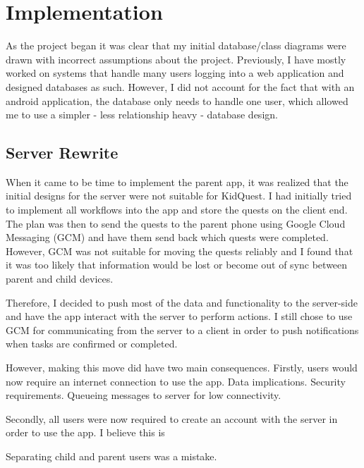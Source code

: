 \chapter{Implementation}

As the project began it was clear that my initial database/class diagrams were drawn with incorrect assumptions about the project. 
Previously, I have mostly worked on systems that handle many users logging into a web application and designed databases as such. 
However, I did not account for the fact that with an android application, the database only needs to handle one user, which allowed me to use a simpler - less relationship heavy - database design.

\section{Server Rewrite}
When it came to be time to implement the parent app, it was realized that the initial designs for the server were not suitable for KidQuest.
I had initially tried to implement all workflows into the app and store the quests on the client end. 
The plan was then to send the quests to the parent phone using Google Cloud Messaging (GCM) and have them send back which quests were completed.
However, GCM was not suitable for moving the quests reliably and I found that it was too likely that information would be lost or become out of sync between parent and child devices.

Therefore, I decided to push most of the data and functionality to the server-side and have the app interact with the server to perform actions.
I still chose to use GCM for communicating from the server to a client in order to push notifications when tasks are confirmed or completed.

However, making this move did have two main consequences. 
Firstly, users would now require an internet connection to use the app.
Data implications.
Security requirements.
Queueing messages to server for low connectivity.

Secondly, all users were now required to create an account with the server in order to use the app.
I believe this is 

Separating child and parent users was a mistake.